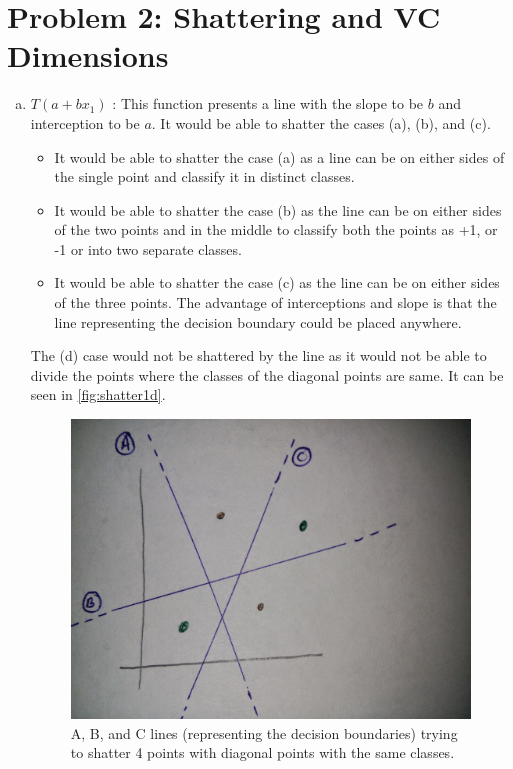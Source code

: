 \documentclass[a4paper, 11pt]{article}
\begin{document}
\pagebreak
\section*{Problem 2: Shattering and VC Dimensions}
\vspace{-10pt}

\begin{enumerate}[(a)]
\item \(T(a+bx_1)\) : This function presents a line with the slope to be \(b\) and interception to be \(a\). It would be able to shatter the cases (a), (b),  and (c). 
\begin{itemize}
\item It would be able to shatter the case (a) as a line can be on either sides of the single point and classify it in distinct classes.
\item It would be able to shatter the case (b) as the line can be on either sides of the two points and in the middle to classify both the points as +1, or -1 or into two separate classes.
\item It would be able to shatter the case (c) as the line can be on either sides of the three points. The advantage of interceptions and slope is that the line representing the decision boundary could be placed anywhere.
\end{itemize}
The (d) case would not be shattered by the line as it would not be able to divide the points where the classes of the diagonal points are same. It can be seen in \autoref{fig:shatter1d}.

\begin{figure}
\centering
\includegraphics[scale=0.15]{shatter1.jpg}
\caption[Example Problem and Solution]{A, B, and C lines (representing the decision boundaries) trying to shatter 4 points with diagonal points with the same classes.}
\label{fig:shatter1d}
\end{figure}


\end{enumerate}
\end{document}
